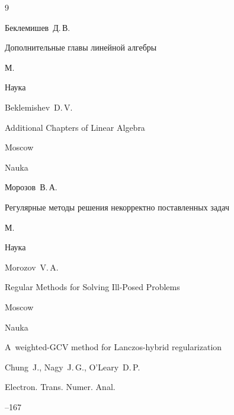\begin{thebibliography}{9}




\by Беклемишев~Д.\,В. 

\book Дополнительные главы линейной алгебры 

\publaddr М. 

\publ Наука 



\misctransl

\by Beklemishev~D.\,V. 

\book Additional Chapters of Linear Algebra

\publaddr Moscow

\publ Nauka 






\by Морозов~В.\,А. 

\book Регулярные методы решения некорректно поставленных задач 

\publaddr М.

\publ Наука 



\misctransl

\by Morozov~V.\,A.

\book Regular Methods for Solving Ill-Posed Problems

\publaddr Moscow

\publ Nauka








\paper A~weighted-GCV method for Lanczos-hybrid regularization 

\by Chung~J., Nagy~J.\,G., O'Leary~D.\,P. 

\jour Electron. Trans. Numer. Anal.




--167




\end{thebibliography}
